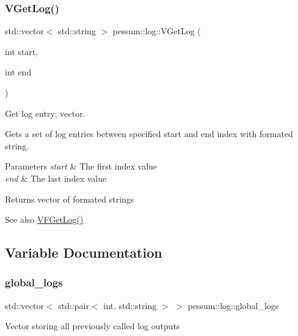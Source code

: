 \subsubsection{\texorpdfstring{V\+Get\+Log()}{VGetLog()}}
{\footnotesize\ttfamily std\+::vector$<$ std\+::string $>$ pessum\+::log\+::\+V\+Get\+Log (\begin{DoxyParamCaption}\item[{int}]{start,  }\item[{int}]{end }\end{DoxyParamCaption})}



Get log entry; vector. 

Gets a set of log entries between specified start and end index with formated string. 
\begin{DoxyParams}{Parameters}
{\em start} & The first index value \\
\hline
{\em end} & The last index value \\
\hline
\end{DoxyParams}
\begin{DoxyReturn}{Returns}
vector of formated strings 
\end{DoxyReturn}
\begin{DoxySeeAlso}{See also}
\hyperlink{namespacepessum_1_1log_a65630db6abcfb529e61e5df0a492ebf4}{V\+F\+Get\+Log()} 
\end{DoxySeeAlso}


\subsection{Variable Documentation}
\mbox{\label{namespacepessum_1_1log_a8a1cb7b63dbf69c0f4c6c155e09ea5c1}} 
\subsubsection{\texorpdfstring{global\+\_\+logs}{global\_logs}}
{\footnotesize\ttfamily std\+::vector$<$ std\+::pair$<$ int, std\+::string $>$ $>$ pessum\+::log\+::global\+\_\+logs}

Vector storing all previously called log outputs \mbox{\label{namespacepessum_1_1log_a108e1c71c8daf36fe556a757a67cb7e3}} 

